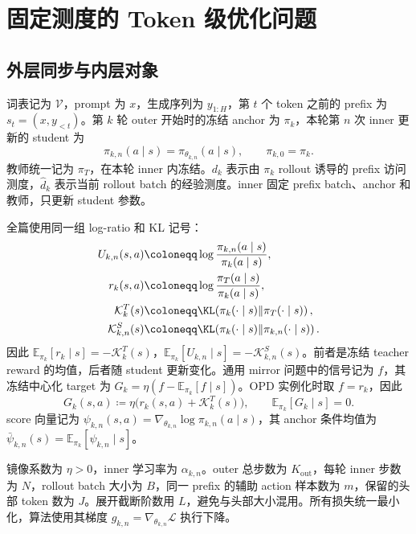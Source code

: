 \chapter{固定测度的 Token 级优化问题}

\section{外层同步与内层对象}

词表记为 $\mathcal V$，prompt 为 $x$，生成序列为 $y_{1:H}$，第 $t$ 个 token 之前的 prefix 为 $s_t=(x,y_{<t})$。第 $k$ 轮 outer 开始时的冻结 anchor 为 $\pi_k$，本轮第 $n$ 次 inner 更新的 student 为
\begin{equation}
\pi_{k,n}(a\mid s)=\pi_{\theta_{k,n}}(a\mid s),
\qquad \pi_{k,0}=\pi_k.
\end{equation}
教师统一记为 $\pi_T$，在本轮 inner 内冻结。$d_k$ 表示由 $\pi_k$ rollout 诱导的 prefix 访问测度，$\widehat d_k$ 表示当前 rollout batch 的经验测度。inner 固定 prefix batch、anchor 和教师，只更新 student 参数。

全篇使用同一组 log-ratio 和 KL 记号：
\begin{align}
U_{k,n}(s,a)&\coloneqq\log\frac{\pi_{k,n}(a\mid s)}{\pi_k(a\mid s)},\\
r_k(s,a)&\coloneqq\log\frac{\pi_T(a\mid s)}{\pi_k(a\mid s)},\\
\mathcal K_k^T(s)&\coloneqq\KL\!\left(\pi_k(\cdot\mid s)\Vert\pi_T(\cdot\mid s)\right),\\
\mathcal K_{k,n}^S(s)&\coloneqq\KL\!\left(\pi_k(\cdot\mid s)\Vert\pi_{k,n}(\cdot\mid s)\right).
\end{align}
因此 $\mathbb E_{\pi_k}[r_k\mid s]=-\mathcal K_k^T(s)$，$\mathbb E_{\pi_k}[U_{k,n}\mid s]=-\mathcal K_{k,n}^S(s)$。前者是冻结 teacher reward 的均值，后者随 student 更新变化。通用 mirror 问题中的信号记为 $f$，其冻结中心化 target 为 $G_k=\eta(f-\mathbb E_{\pi_k}[f\mid s])$。OPD 实例化时取 $f=r_k$，因此
\begin{equation}
G_k(s,a)\coloneqq\eta\bigl(r_k(s,a)+\mathcal K_k^T(s)\bigr),
\qquad\mathbb E_{\pi_k}[G_k\mid s]=0.
\end{equation}
score 向量记为 $\psi_{k,n}(s,a)=\nabla_{\theta_{k,n}}\log\pi_{k,n}(a\mid s)$，其 anchor 条件均值为 $\bar\psi_{k,n}(s)=\mathbb E_{\pi_k}[\psi_{k,n}\mid s]$。

镜像系数为 $\eta>0$，inner 学习率为 $\alpha_{k,n}$。outer 总步数为 $K_{\mathrm{out}}$，每轮 inner 步数为 $N$，rollout batch 大小为 $B$，同一 prefix 的辅助 action 样本数为 $m$，保留的头部 token 数为 $J$。展开截断阶数用 $L$，避免与头部大小混用。所有损失统一最小化，算法使用其梯度 $g_{k,n}=\nabla_{\theta_{k,n}}\mathcal L$ 执行下降。

